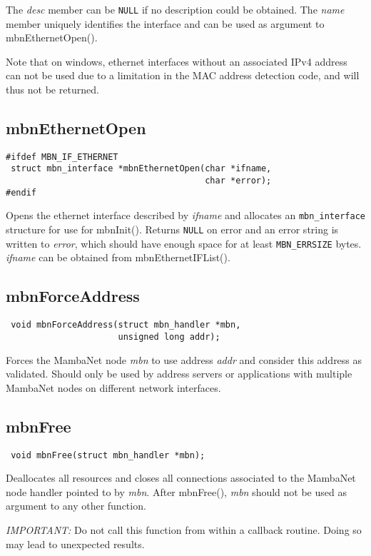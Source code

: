 \documentclass[a4paper]{report}
\begin{document}
The \textit{desc} member can be \verb|NULL| if no description could be obtained. The \textit{name} member uniquely identifies the interface and can be used as argument to mbnEthernetOpen().

Note that on windows, ethernet interfaces without an associated IPv4 address can not be used due to a limitation in the MAC address detection code, and will thus not be returned.


\subsection{mbnEthernetOpen}
\begin{verbatim}
#ifdef MBN_IF_ETHERNET
 struct mbn_interface *mbnEthernetOpen(char *ifname,
                                       char *error);
#endif
\end{verbatim}
Opens the ethernet interface described by \textit{ifname} and allocates an \verb|mbn_interface| structure for use for mbnInit(). Returns \verb|NULL| on error and an error string is written to \textit{error}, which should have enough space for at least \verb|MBN_ERRSIZE| bytes. \textit{ifname} can be obtained from mbnEthernetIFList().


\subsection{mbnForceAddress}
\begin{verbatim}
 void mbnForceAddress(struct mbn_handler *mbn,
                      unsigned long addr);
\end{verbatim}
Forces the MambaNet node \textit{mbn} to use address \textit{addr} and consider this address as validated. Should only be used by address servers or applications with multiple MambaNet nodes on different network interfaces.


\subsection{mbnFree}
\begin{verbatim}
 void mbnFree(struct mbn_handler *mbn);
\end{verbatim}
Deallocates all resources and closes all connections associated to the MambaNet node handler pointed to by \textit{mbn}. After mbnFree(), \textit{mbn} should not be used as argument to any other function.

\emph{IMPORTANT:} Do not call this function from within a callback routine. Doing so may lead to unexpected results.
\end{document}
